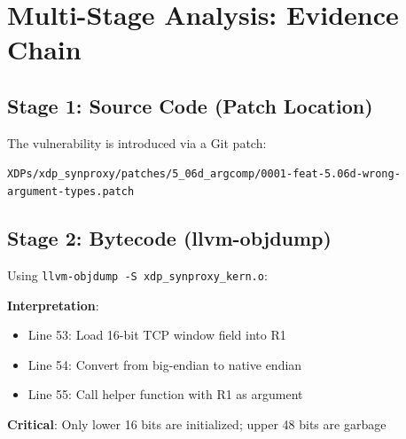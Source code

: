 \section{Multi-Stage Analysis: Evidence Chain}

\subsection{Stage 1: Source Code (Patch Location)}

The vulnerability is introduced via a Git patch:
\begin{tcolorbox}[colback=gray!10, colframe=gray!10, arc=2pt, boxrule=0pt]
\small\ttfamily
\texttt{XDPs/xdp\_synproxy/patches/5\_06d\_argcomp/0001-feat-5.06d-wrong-argument-types.patch}
\end{tcolorbox}

\subsection{Stage 2: Bytecode (llvm-objdump)}

Using \texttt{llvm-objdump -S xdp\_synproxy\_kern.o}:

\vspace{0.3cm}
\noindent
{}
\vspace{0.3cm}

\noindent
\textbf{Interpretation}: 
\begin{itemize}
  \item Line 53: Load 16-bit TCP window field into R1
  \item Line 54: Convert from big-endian to native endian
  \item Line 55: Call helper function with R1 as argument
\end{itemize}

\noindent
\textbf{Critical}: Only lower 16 bits are initialized; upper 48 bits are garbage

